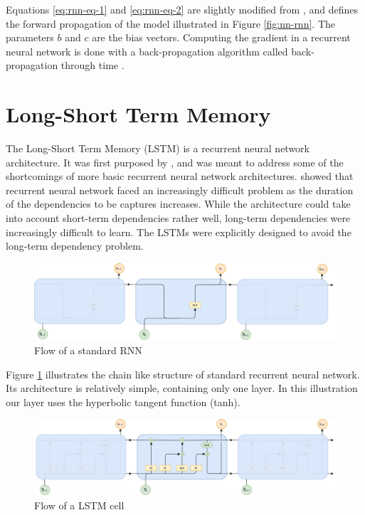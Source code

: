Equations \ref{eq:rnn-eq-1} and \ref{eq:rnn-eq-2} are slightly modified from \citep{goodfellow2016deeplearning}, and defines the forward propagation of the model illustrated in Figure \ref{fig:nn-rnn}. The parameters \(b\) and \(c\) are the bias vectors. Computing the gradient in a recurrent neural network is done with a back-propagation algorithm called back-propagation through time \citep{werbos1990backpropagation}. 


\section{Long-Short Term Memory}
\label{sec:long_short_term_memory}
The Long-Short Term Memory (LSTM) is a recurrent neural network architecture. It was first purposed by \citep{hochreiter1997long}, and was meant to address some of the shortcomings of more basic recurrent neural network architectures. \citep{bengio1994learning} showed that recurrent neural network faced an increasingly difficult problem as the duration of the dependencies to be captures increases. While the architecture could take into account short-term dependencies rather well, long-term dependencies were increasingly difficult to learn. The LSTMs were explicitly designed to avoid the long-term dependency problem. 

\begin{figure}[ht]
    \centering
    \includegraphics[width=1\textwidth]{fig/related_work/rnn_flow.pdf}
    \caption{Flow of a standard RNN}
    \label{fig:nn-rnn-flow}
\end{figure}

Figure \ref{fig:nn-rnn-flow} illustrates the chain like structure of standard recurrent neural network. Its architecture is relatively simple, containing only one layer. In this illustration our layer uses the hyperbolic tangent function (tanh).

\begin{figure}[ht]
    \centering
    \includegraphics[width=1\textwidth]{fig/related_work/lstm_flow.pdf}
    \caption{Flow of a LSTM cell}
    \label{fig:nn-lstm-flow}
\end{figure}

